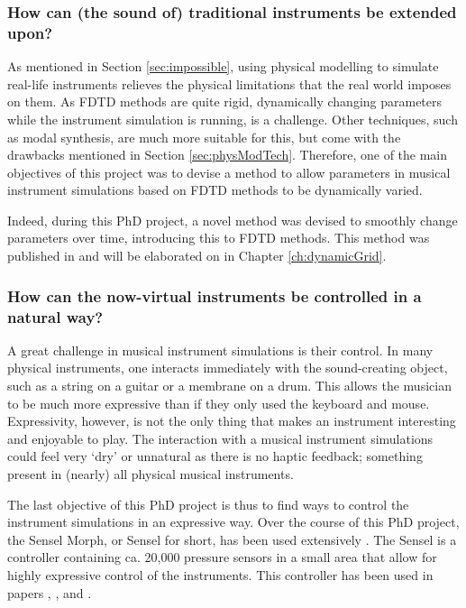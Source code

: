 \subsubsection{How can (the sound of) traditional instruments be extended upon?}
As mentioned in Section \ref{sec:impossible}, using physical modelling to simulate real-life instruments relieves the physical limitations that the real world imposes on them.
As FDTD methods are quite rigid, dynamically changing parameters while the instrument simulation is running, is a challenge. Other techniques, such as modal synthesis, are much more suitable for this, but come with the drawbacks mentioned in Section \ref{sec:physModTech}. Therefore, one of the main objectives of this project was to devise a method to allow parameters in musical instrument simulations based on FDTD methods to be dynamically varied.

Indeed, during this PhD project, a novel method was devised to smoothly change parameters over time, introducing this to FDTD methods. This method was published in \citeP[G] and will be elaborated on in Chapter \ref{ch:dynamicGrid}.

\subsubsection{How can the now-virtual instruments be controlled in a natural way?}

A great challenge in musical instrument simulations is their control. In many physical instruments, one interacts immediately with the sound-creating object, such as a string on a guitar or a membrane on a drum. This allows the musician to be much more expressive than if they only used the keyboard and mouse. 
Expressivity, however, is not the only thing that makes an instrument interesting and enjoyable to play. The interaction with a musical instrument simulations could feel very `dry' or unnatural as there is no haptic feedback; something present in (nearly) all physical musical instruments. 

The last objective of this PhD project is thus to find ways to control the instrument simulations in an expressive way. 
Over the course of this PhD project, the Sensel Morph, or Sensel for short, has been used extensively  \cite{sensel}. The Sensel is a controller containing ca. 20,000 pressure sensors in a small area that allow for highly expressive control of the instruments. This controller has been used in papers \citeP[A], \citeP[B], \citeP[C] and \citeP[D].

